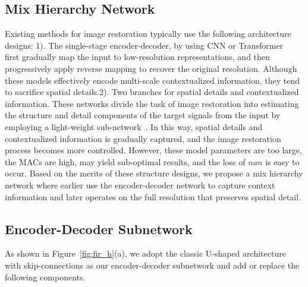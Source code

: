 \documentclass[lettersize,journal]{IEEEtran}
\begin{document}
\subsection{Mix Hierarchy Network}
Existing methods for image restoration typically use the following architecture designs: 1). The single-stage encoder-decoder, by using CNN or Transformer~\cite{2018Unprocessing,2018learning,deganv2,Zamir2021Restormer,liang2021swinir} first gradually map the input to low-resolution representations, and then progressively apply reverse mapping to recover the original resolution. Although these models effectively encode multi-scale contextualized information, they tend to sacrifice spatial details.2). Two branches for spatial details and  contextualized information. These networks  divide the task of image restoration into estimating the structure and detail components of the target signals from the input by employing a light-weight sub-network~\cite{Zamir2021MPRNet,Zhang_2019_CVPR,RESCAN}. In this way, spatial details and contextualized information is gradually captured, and the image restoration process becomes more controlled. However, these model parameters are too large, the MACs are high, may yield sub-optimal results, and the loss of $nan$ is easy to occur. Based on the merits of these  structure designs, we propose a mix hierarchy network where earlier use the encoder-decoder network to capture context information and later operates on the full resolution that preserves spatial detail.

\subsection{Encoder-Decoder Subnetwork}
As shown in Figure~\ref{fig:fir_h}(a), we adopt the classic U-shaped architecture with skip-connections as our encoder-decoder subnetwork and add or replace the following components. 
 
\end{document}
